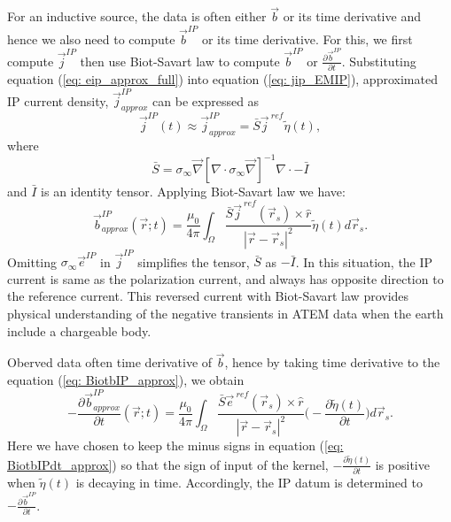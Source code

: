 \documentclass[a4paper, 11pt]{article}
\renewcommand{\div}{\nabla\cdot}
\newcommand{\grad}{\vec \nabla}
\newcommand{\siginf}{\sigma_\infty}
\renewcommand {\j}  { {\vec j} }
\renewcommand {\b}  { {\vec b} }
\newcommand {\e}  { {\vec e} }
\newcommand{\peta}{\tilde{\eta}}
\newcommand{\eref}{\e^{\ ref}}
\newcommand{\jref}{\j^{\ ref}}
\begin{document}
For an inductive source, the data is often either $\b$ or its time derivative and hence we also need to compute $\b^{IP}$ or its time derivative.
For this, we first compute $\j^{IP}$ then use Biot-Savart law to compute $\b^{IP}$ or $\frac{\partial \b^{IP}}{\partial t}$. 
Substituting equation (\ref{eq: eip_approx_full}) into equation (\ref{eq: jip_EMIP}), approximated IP current density, $\j^{IP}_{approx}$ can be expressed as
\begin{equation}
  \j^{IP}(t) \approx \j^{IP}_{approx} = \bar{S}\jref\peta(t),
  \label{eq: jip_approx}
\end{equation}
where
\begin{equation}
  \bar{S} = \siginf\grad[\div \siginf\grad]^{-1}\div-\bar{I}
\end{equation}
and $\bar{I}$ is an identity tensor. 
Applying Biot-Savart law we have:
\begin{equation}
  \b^{IP}_{approx}(\vec{r}; t) = \frac{\mu_0}{4\pi}\int_{\Omega}  \frac{\bar{S}\j^{\ ref}(\vec{r}_s)\times\hat{r}}{|\vec{r}-\vec{r}_s|^2}\peta(t)d\vec{r}_s.
  \label{eq: BiotbIP_approx}
\end{equation}
Omitting $\siginf\e^{IP}$ in $\j^{IP}$ simplifies the tensor, $\bar{S}$ as $-\bar{I}$. 
In this situation, the IP current is same as the polarization current, and always has opposite direction to the reference current. 
This reversed current with Biot-Savart law provides physical understanding of the negative transients in ATEM data when the earth include a chargeable body. 

Oberved data often time derivative of $\b$, hence by taking time derivative to the equation (\ref{eq: BiotbIP_approx}), we obtain
\begin{equation}
  -\frac{\partial\b^{IP}_{approx}}{\partial t}(\vec{r}; t) = \frac{\mu_0}{4\pi} \int_{\Omega}  \frac{\bar{S}\eref(\vec{r}_s)\times\hat{r}}{|\vec{r}-\vec{r}_s|^2} \Big( -\frac{\partial \peta(t)}{\partial t} \Big) d\vec{r}_s.
  \label{eq: BiotbIPdt_approx}
\end{equation}
Here we have chosen to keep the minus signs in equation (\ref{eq: BiotbIPdt_approx}) so that the sign of input of the kernel, $-\frac{\partial \peta(t)}{\partial t}$ is positive when $\peta(t)$ is decaying in time. 
Accordingly, the IP datum is determined to $-\frac{\partial\b^{IP}}{\partial t}$. 
\end{document}
